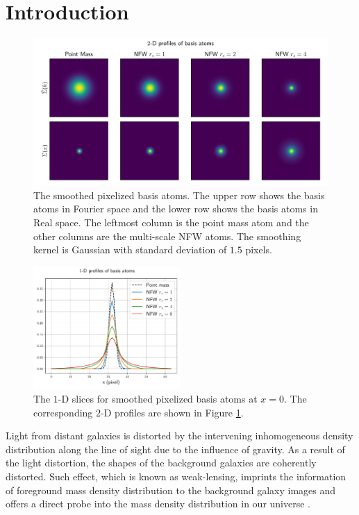 \documentclass[twocolumn]{aastex62}
\begin{document}
\section{Introduction}

\begin{figure}[!t]
    \includegraphics[width=1.\textwidth]{nfwlet-atom-2D.pdf}
    \caption{The smoothed pixelized basis atoms. The upper row shows the basis atoms in Fourier space
            and the lower row shows the basis atoms in Real space.
            The leftmost column is the point mass atom and the other columns are the multi-scale NFW atoms.
            The smoothing kernel is Gaussian with standard deviation of $1.5$ pixels.} \label{fig-atoms2D}
\end{figure}

\begin{figure}
 \includegraphics[width=0.5\textwidth]{nfwlet-atom-1D.pdf}
 \caption{The $1$-D slices for smoothed pixelized basis atoms at $x=0$. The corresponding $2$-D profiles are 
        shown in Figure \ref{fig-atoms2D}.} \label{fig-atoms1D}
\end{figure}

Light from distant galaxies is distorted by the intervening inhomogeneous density distribution along the line of sight
due to the influence of gravity. As a result of the light distortion, the shapes of the background galaxies are coherently
distorted. Such effect, which is known as weak-lensing, imprints the information of foreground mass density distribution
to the background galaxy images and offers a direct probe into the mass density distribution in our universe
\citep[see][for recent reviews]{revKilbinger15,revRachel17}.
\end{document}
